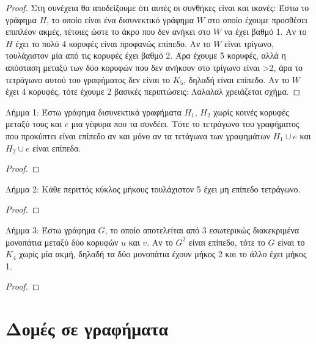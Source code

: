 \documentclass[a4paper, oneside, 11pt]{article}
\theoremstyle{definition}
\begin{document}
\begin{enumerate}
\begin{proof}
Στη συνέχεια θα αποδείξουμε ότι αυτές οι συνθήκες είναι και ικανές: Έστω το γράφημα $H$, το οποίο είναι ένα δισυνεκτικό γράφημα $W$ στο οποίο έχουμε προσθέσει επιπλέον ακμές, τέτοιες ώστε το άκρο που
δεν ανήκει στο $W$ να έχει βαθμό 1. Αν το $H$ έχει το πολύ 4 κορυφές είναι προφανώς επίπεδο. Αν το $W$ είναι τρίγωνο, τουλάχιστον μία από τις κορυφές έχει βαθμό 2. Άρα έχουμε 5 κορυφές, αλλά η απόσταση 
μεταξύ των δύο κορυφών που δεν ανήκουν στο τρίγωνο είναι >2, άρα το τετράγωνο αυτού του γραφήματος δεν είναι το $K_5$, δηλαδή είναι επίπεδο. Αν το $W$ έχει 4 κορυφές, τότε έχουμε 2 βασικές περιπτώσεις:
Λαλαλαλ χρειάζεται σχήμα.

	\end{proof}

Λήμμα 1: Έστω γράφημα δισυνεκτικά γραφήματα $H_1$, $H_2$ χωρίς κοινές κορυφές μεταξύ τους και $e$ μια γέφυρα που τα συνδέει. Τότε το τετράγωνο του γραφήματος που προκύπτει είναι επίπεδο αν και
μόνο αν τα τετάγωνα των γραφημάτων $H_1 \cup e$ και $H_2 \cup e$ είναι επίπεδα.
	\begin{proof}
	\end{proof}
Λήμμα 2: Κάθε περιττός κύκλος μήκους τουλάχιστον 5 έχει μη επίπεδο τετράγωνο.
	\begin{proof}
	\end{proof}
Λήμμα 3: Έστω γράφημα $G$, το οποίο αποτελείται από 3 εσωτερικώς διακεκριμένα μονοπάτια μεταξύ δύο κορυφών $u$ και $v$. Αν το $G^2$ είναι επίπεδο, τότε το $G$ είναι το $K_4$ χωρίς μία ακμή, δηλαδή τα δύο μονοπάτια έχουν μήκος 2 και το άλλο έχει μήκος 1.
	\begin{proof}
	\end{proof}
\end{enumerate}

\section{Δομές σε γραφήματα}
\end{document}
